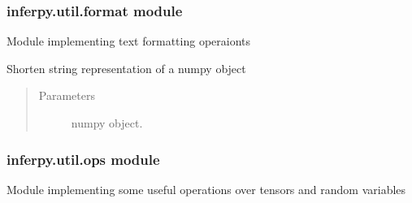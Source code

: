 \documentclass[letterpaper,10pt,english]{sphinxmanual}
\begin{document}
\subsubsection{inferpy.util.format module}
\label{\detokenize{modules/inferpy.util:inferpy-util-format-module}}\label{\detokenize{modules/inferpy.util:module-inferpy.util.format}}
Module implementing text formatting operaionts

\begin{fulllineitems}
\label{\detokenize{modules/inferpy.util:inferpy.util.format.np_str}}
Shorten string representation of a numpy object
\begin{quote}\begin{description}
\item[{Parameters}] \leavevmode
{} \textendash{} numpy object.

\end{description}\end{quote}

\end{fulllineitems}



\subsubsection{inferpy.util.ops module}
\label{\detokenize{modules/inferpy.util:inferpy-util-ops-module}}\label{\detokenize{modules/inferpy.util:module-inferpy.util.ops}}
Module implementing some useful operations over tensors and random variables
\end{document}
